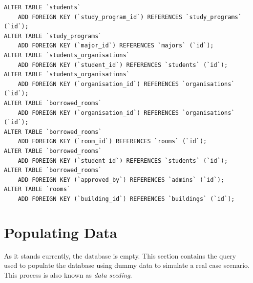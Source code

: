 \documentclass[12pt,titlepage]{article}
\begin{document}
\begin{verbatim}
ALTER TABLE `students`
    ADD FOREIGN KEY (`study_program_id`) REFERENCES `study_programs` (`id`);
ALTER TABLE `study_programs`
    ADD FOREIGN KEY (`major_id`) REFERENCES `majors` (`id`);
ALTER TABLE `students_organisations`
    ADD FOREIGN KEY (`student_id`) REFERENCES `students` (`id`);
ALTER TABLE `students_organisations`
    ADD FOREIGN KEY (`organisation_id`) REFERENCES `organisations` (`id`);
ALTER TABLE `borrowed_rooms`
    ADD FOREIGN KEY (`organisation_id`) REFERENCES `organisations` (`id`);
ALTER TABLE `borrowed_rooms`
    ADD FOREIGN KEY (`room_id`) REFERENCES `rooms` (`id`);
ALTER TABLE `borrowed_rooms`
    ADD FOREIGN KEY (`student_id`) REFERENCES `students` (`id`);
ALTER TABLE `borrowed_rooms`
    ADD FOREIGN KEY (`approved_by`) REFERENCES `admins` (`id`);
ALTER TABLE `rooms`
    ADD FOREIGN KEY (`building_id`) REFERENCES `buildings` (`id`);
\end{verbatim}

\pagebreak

\section{Populating Data}
As it stands currently, the database is empty. This section contains the query used to populate the database
using dummy data to simulate a real case scenario. This process is also known as \textit{data seeding}.
\end{document}
